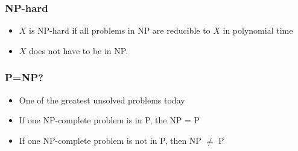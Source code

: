 \documentclass{beamer}
\begin{document}
\begin{frame}
\frametitle{NP-hard}

\begin{itemize}
\item $X$ is NP-hard if all problems in NP are reducible to $X$ in polynomial time
\item $X$ does not have to be in NP.

\end{itemize}

\end{frame}
\begin{frame}
\frametitle{P=NP?}
\begin{itemize}
\item One of the greatest unsolved problems today
\item If one NP-complete problem is in P, the NP = P
\item If one NP-complete problem is not in P, then NP $\neq $ P
\end{itemize}
\end{frame}
\end{document}
